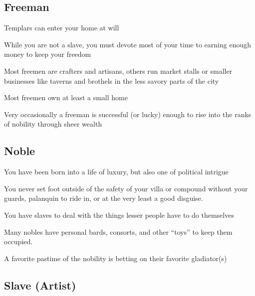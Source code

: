 \begin{multicols}{2}

\subsection{Freeman}

\begin{description}
    \item Templars can enter your home at will
    \item While you are not a slave, you must devote most of your time to earning enough money to keep your freedom
    \item Most freemen are crafters and artisans, others run market stalls or smaller businesses like taverns and brothels in the less savory parts of the city
    \item Most freemen own at least a small home
    \item Very occasionally a freeman is successful (or lucky) enough to rise into the ranks of nobility through sheer wealth
\end{description}

\subsection{Noble}

\begin{description}
    \item You have been born into a life of luxury, but also one of political intrigue
    \item You never set foot outside of the safety of your villa or compound without your guards, palanquin to ride in, or at the very least a good disguise.
    \item You have slaves to deal with the things lesser people have to do themselves
    \item Many nobles have personal bards, consorts, and other “toys” to keep them occupied.
    \item A favorite pastime of the nobility is betting on their favorite gladiator(s)
\end{description}

\subsection{Slave (Artist)}


\end{multicols}
